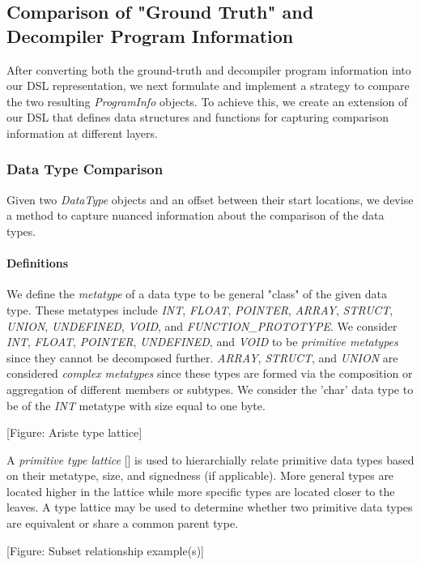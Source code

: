 \documentclass[conference]{IEEEtran}
\begin{document}
\subsection{Comparison of "Ground Truth" and Decompiler Program Information}

After converting both the ground-truth and decompiler program information into our DSL representation, we next formulate and implement a strategy to compare the two resulting \emph{ProgramInfo} objects. To achieve this, we create an extension of our DSL that defines data structures and functions for capturing comparison information at different layers.

\subsubsection{Data Type Comparison}

Given two \emph{DataType} objects and an offset between their start locations, we devise a method to capture nuanced information about the comparison of the data types.

\paragraph{Definitions}

We define the \emph{metatype} of a data type to be general "class" of the given data type. These metatypes include \emph{INT}, \emph{FLOAT}, \emph{POINTER}, \emph{ARRAY}, \emph{STRUCT}, \emph{UNION}, \emph{UNDEFINED}, \emph{VOID}, and \emph{FUNCTION\_PROTOTYPE}. We consider \emph{INT}, \emph{FLOAT}, \emph{POINTER}, \emph{UNDEFINED}, and \emph{VOID} to be \emph{primitive metatypes} since they cannot be decomposed further. \emph{ARRAY}, \emph{STRUCT}, and \emph{UNION} are considered \emph{complex metatypes} since these types are formed via the composition or aggregation of different members or subtypes. We consider the 'char' data type to be of the \emph{INT} metatype with size equal to one byte.

[Figure: Ariste type lattice]

A \emph{primitive type lattice} [] is used to hierarchially relate primitive data types based on their metatype, size, and signedness (if applicable). More general types are located higher in the lattice while more specific types are located closer to the leaves. A type lattice may be used to determine whether two primitive data types are equivalent or share a common parent type.

[Figure: Subset relationship example(s)]
\end{document}
